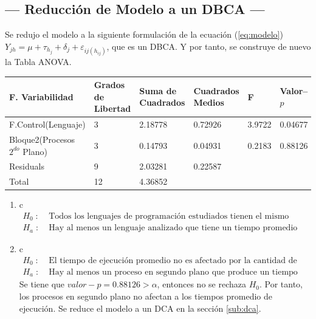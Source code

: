 \documentclass[11pt,a4paper]{article}
\begin{document}
\subsection{--- Reducción de Modelo a un DBCA ---} %
\label{sub:dbca}
Se redujo el modelo a la siguiente formulación de la ecuación (\ref{eq:modelo}) \(Y_{jh} = \mu + \tau _{h_{j}} + \delta _j + \varepsilon _{ij(h_{ij})}\), que es un DBCA. Y por tanto, se construye de nuevo la Tabla ANOVA.
\begin{table}[hbt!]
	\centering
	\footnotesize
	\begin{tabular}{|*{6}{l|}}
		\hline
		F. Variabilidad                   & Grados de Libertad & Suma de Cuadrados & Cuadrados Medios & F & Valor--\(p\) \\ \hline
		F.Control(Lenguaje) & 3 & 2.18778 & 0.72926  & 3.9722 & 0.04677\\ \hline
		Bloque2(Procesos \(2^{do}\) Plano)  & 3 & 0.14793 & 0.04931  & 0.2183 & 0.88126\\ \hline
		Residuals           & 9 & 2.03281 & 0.22587  &        &        \\ \hline
		Total               &12 & 4.36852 &          &        & \\ \hline
	\end{tabular}
	\label{tab:nuevo_modelo}
\end{table}
\begin{enumerate}
	\item[\fbox{Hip. Principal}] \color{white} c \color{black}
		\[
			\begin{array}{rl}
				H_0 \;:\; & \mbox{Todos los lenguajes de programación estudiados tienen el mismo tiempo de ejecución promedio.} \\
				H_a \;:\; & \mbox{Hay al menos un lenguaje analizado que tiene un tiempo promedio de ejecución diferente.}
			\end{array}
		\]
	\item[\fbox{Hip. Secundaria 2}] \color{white} c \color{black}
		\[
			\begin{array}{rl}
				H_0 \;:\; & \mbox{El tiempo de ejecución promedio no es afectado por la cantidad de procesos en segundo plano.} \\
				H_a \;:\; & \mbox{Hay al menos un proceso en segundo plano que produce un tiempo de ejecución promedio diferente.}
			\end{array}
		\]
		Se tiene que \(valor-p = 0.88126 > \alpha\), entonces no se rechaza \(H_0\).
		Por tanto, los procesos en segundo plano no afectan a los tiempos promedio de ejecución.
		Se reduce el modelo a un DCA en la sección \ref{sub:dca}.
\end{enumerate}
\end{document}
